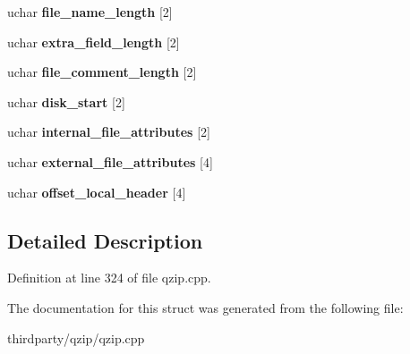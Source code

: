 \begin{DoxyCompactItemize}
\mbox{\label{struct_m_central_file_header_a86b53492f6262b6b551e87df2acb1138}} 
uchar {\bfseries file\+\_\+name\+\_\+length} \mbox{[}2\mbox{]}
\item 
\mbox{\label{struct_m_central_file_header_a075b5aad38e5d10119d50f88d37703d5}} 
uchar {\bfseries extra\+\_\+field\+\_\+length} \mbox{[}2\mbox{]}
\item 
\mbox{\label{struct_m_central_file_header_afdb3951944b16d2fd05598c4d54e68b2}} 
uchar {\bfseries file\+\_\+comment\+\_\+length} \mbox{[}2\mbox{]}
\item 
\mbox{\label{struct_m_central_file_header_a75148d04024a23744b6ec58b2955d2bc}} 
uchar {\bfseries disk\+\_\+start} \mbox{[}2\mbox{]}
\item 
\mbox{\label{struct_m_central_file_header_ad326a9b74fa7afea1715341274d6272c}} 
uchar {\bfseries internal\+\_\+file\+\_\+attributes} \mbox{[}2\mbox{]}
\item 
\mbox{\label{struct_m_central_file_header_ad1b891c0bd2a2eb644f2b8b6828ce47f}} 
uchar {\bfseries external\+\_\+file\+\_\+attributes} \mbox{[}4\mbox{]}
\item 
\mbox{\label{struct_m_central_file_header_afb7c3bc5f8b182185293458073f0d88c}} 
uchar {\bfseries offset\+\_\+local\+\_\+header} \mbox{[}4\mbox{]}
\end{DoxyCompactItemize}


\subsection{Detailed Description}


Definition at line 324 of file qzip.\+cpp.



The documentation for this struct was generated from the following file\+:\begin{DoxyCompactItemize}
\item 
thirdparty/qzip/qzip.\+cpp\end{DoxyCompactItemize}
